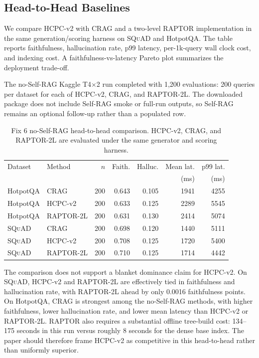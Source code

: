 
\subsection{Head-to-Head Baselines}
\label{sec:fix06_baselines}

We compare HCPC-v2 with CRAG and a two-level RAPTOR implementation in the
same generation/scoring harness on \textsc{SQuAD} and HotpotQA. The table
reports faithfulness, hallucination rate, p99 latency, per-1k-query wall
clock cost, and indexing cost. A faithfulness-vs-latency Pareto plot
summarizes the deployment trade-off.

The no-Self-RAG Kaggle T4$\times$2 run completed with 1,200 evaluations:
200 queries per dataset for each of HCPC-v2, CRAG, and RAPTOR-2L. The
downloaded package does not include Self-RAG smoke or full-run outputs, so
Self-RAG remains an optional follow-up rather than a populated row.

\begin{table}[t]
\centering
\small
\begin{tabular}{llrrrrr}
\toprule
Dataset & Method & $n$ & Faith. & Halluc. & Mean lat. & p99 lat. \\
 & & & & & (ms) & (ms) \\
\midrule
HotpotQA & CRAG & 200 & 0.643 & 0.105 & 1941 & 4255 \\
HotpotQA & HCPC-v2 & 200 & 0.633 & 0.125 & 2289 & 5545 \\
HotpotQA & RAPTOR-2L & 200 & 0.631 & 0.130 & 2414 & 5074 \\
\textsc{SQuAD} & CRAG & 200 & 0.698 & 0.120 & 1440 & 5111 \\
\textsc{SQuAD} & HCPC-v2 & 200 & 0.708 & 0.125 & 1720 & 5400 \\
\textsc{SQuAD} & RAPTOR-2L & 200 & 0.710 & 0.125 & 1714 & 4442 \\
\bottomrule
\end{tabular}
\caption{Fix 6 no-Self-RAG head-to-head comparison. HCPC-v2, CRAG, and
RAPTOR-2L are evaluated under the same generator and scoring harness.}
\label{tab:fix06_noselfrag}
\end{table}

The comparison does not support a blanket dominance claim for HCPC-v2. On
\textsc{SQuAD}, HCPC-v2 and RAPTOR-2L are effectively tied in faithfulness
and hallucination rate, with RAPTOR-2L ahead by only 0.0016 faithfulness
points. On HotpotQA, CRAG is strongest among the no-Self-RAG methods, with
higher faithfulness, lower hallucination rate, and lower mean latency than
HCPC-v2 or RAPTOR-2L. RAPTOR also requires a substantial offline tree-build
cost: 134--175 seconds in this run versus roughly 8 seconds for the dense base
index. The paper should therefore frame HCPC-v2 as competitive in this
head-to-head rather than uniformly superior.
